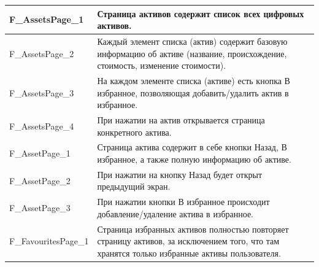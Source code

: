 \documentclass[a4paper, 14pt]{article}
\begin{document}
\begin{longtable}{| p{} | p{} |}
    F\_AssetsPage\_1                & Страница активов содержит список всех цифровых активов.                                                                                                                            \\ \hline
    F\_AssetsPage\_2                & Каждый элемент списка (актив) содержит базовую информацию об активе (название, происхождение, стоимость, изменение стоимости).                                                     \\ \hline
    F\_AssetsPage\_3                & На каждом элементе списка (активе) есть кнопка В избранное, позволяющая добавить/удалить актив в избранное.                                                                        \\ \hline
    F\_AssetsPage\_4                & При нажатии на актив открывается страница конкретного актива.                                                                                                                      \\ \hline

    F\_AssetPage\_1                 & Страница актива содержит в себе кнопки Назад, В избранное, а также полную информацию об активе.                                                                                     \\ \hline
    F\_AssetPage\_2                 & При нажатии на кнопку Назад будет открыт предыдущий экран.                                                                                                                         \\ \hline
    F\_AssetPage\_3                 & При нажатии кнопки В избранное происходит добавление/удаление актива в избранное.                                                                                                  \\ \hline

    F\_FavouritesPage\_1            & Страница избранных активов полностью повторяет страницу активов, за исключением того, что там хранятся только избранные активы пользователя.                                       \\ \hline


\end{longtable}
\end{document}
